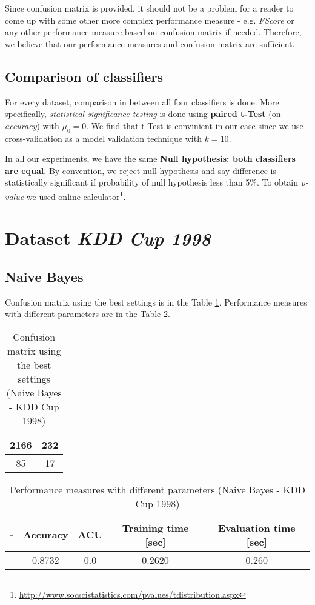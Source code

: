 \documentclass[11pt,a4paper,titlepage]{article}
\begin{document}
Since confusion matrix is provided, it should not be a problem for a reader to come up with some other more complex performance measure - e.g. \textit{FScore} or any other performance measure based on confusion matrix if needed. Therefore, we believe that our performance measures and confusion matrix are sufficient.

\subsection{Comparison of classifiers}

For every dataset, comparison in between all four classifiers is done. More specifically, \textit{statistical significance testing} is done using \textbf{paired t-Test} (on \textit{accuracy}) with $\mu_0 = 0$. We find that t-Test is convinient in our case since we use cross-validation as a model validation technique with $k=10$. 

In all our experiments, we have the same \textbf{Null hypothesis: both classifiers are equal}. By convention, we reject null hypothesis and say difference is statistically significant if probability of null hypothesis less than 5\%. To obtain \textit{p-value} we used online calculator\footnote{\url{http://www.socscistatistics.com/pvalues/tdistribution.aspx}}.


\section{Dataset \textit{KDD Cup 1998}}



\subsection{Naive Bayes}
Confusion matrix using the best settings is in the Table \ref{table:confusionMatrixBayesKDD}. Performance measures with different parameters are in the Table \ref{table:BayesKDD}.
\begin{table}
  \centering
  \begin{tabular}{| c | c |}
    \hline
     \hline
    2166 & 232  \\ \hline
    85 & 17 \\
    \hline
  \end{tabular}
  \caption{Confusion matrix using the best settings (Naive Bayes - KDD Cup 1998)}
  \label{table:confusionMatrixBayesKDD}
  \end{table}
  
  \begin{table}
  \centering
  \begin{tabular}{| c | c | c | c | c |}
    \hline
     		-	   & Accuracy & 	ACU 	& Training time [sec] & Evaluation time [sec] \\ \hline
     &  0.8732 	  &     0.0		& 			0.2620		  & 	0.260	 		\\ \hline
  \end{tabular}
  \caption{Performance measures with different parameters (Naive Bayes - KDD Cup 1998)}
  \label{table:BayesKDD}
  \end{table}
  
\end{document}
